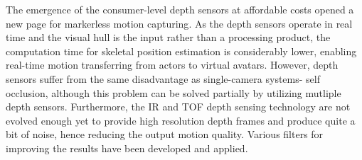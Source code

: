  The emergence of the consumer-level depth sensors at affordable costs opened a new page for markerless motion capturing\cite{Dutta2012}. As the depth sensors operate in real time
 and the visual hull is the input rather than a processing product, the computation time for skeletal position estimation is considerably lower, enabling 
 real-time motion transferring from actors to virtual avatars. However, depth sensors suffer from the same disadvantage as single-camera systems- self occlusion,
 although this problem can be solved partially by utilizing mutliple depth sensors\cite{Berger2011}.
 Furthermore, the IR and TOF depth sensing technology are not evolved enough yet to provide high resolution depth frames and produce quite a bit of noise, hence 
 reducing the output motion quality. Various filters for improving the results have been developed and applied\cite{Matyunin2011,Camplani2012}. 
 